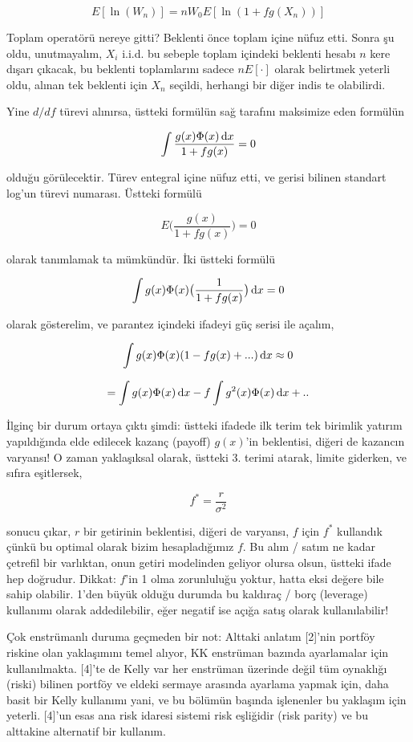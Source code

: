 \documentclass[12pt,fleqn]{article}\usepackage{../../common}
\begin{document}
$$ E[\ln(W_n)] = n W_0 E[\ln (1+fg(X_n))]  $$

Toplam operatörü nereye gitti? Beklenti önce toplam içine nüfuz etti. Sonra
şu oldu, unutmayalım, $X_i$ i.i.d. bu sebeple toplam içindeki beklenti
hesabı $n$ kere dışarı çıkacak, bu beklenti toplamlarını sadece $n
E[\cdot]$ olarak belirtmek yeterli oldu, alınan tek beklenti için $X_n$
seçildi, herhangi bir diğer indis te olabilirdi.

Yine $d/df$ türevi alınırsa, üstteki formülün sağ tarafını maksimize eden
formülün 

$$ \int \frac{g(x) \Phi(x) \,\mathrm{d} x}{1 + fg(x)} = 0$$

olduğu görülecektir. Türev entegral içine nüfuz etti, ve gerisi bilinen
standart log'un türevi numarası. Üstteki formülü 

$$ E \bigg( \frac{g(x)}{1+fg(x)} \bigg) = 0$$

olarak tanımlamak ta mümkündür. İki üstteki formülü 

$$ \int g(x) \Phi(x) \big(\frac{1}{1 + fg(x)} \big) \,\mathrm{d} x = 0$$

olarak gösterelim, ve parantez içindeki ifadeyi güç serisi ile açalım, 

$$ \int g(x) \Phi(x) (1 - fg(x) + ...)  \,\mathrm{d} x \approx 0$$

$$ = \int g(x)\Phi(x) \,\mathrm{d} x  - f \int g^2(x)\Phi(x) \,\mathrm{d} x + ..  $$

İlginç bir durum ortaya çıktı şimdi: üstteki ifadede ilk terim tek birimlik
yatırım yapıldığında elde edilecek kazanç (payoff) $g(x)$'in beklentisi,
diğeri de kazancın varyansı! O zaman yaklaşıksal olarak, üstteki 3. terimi
atarak, limite giderken, ve sıfıra eşitlersek,

$$ f^\ast = \frac{r}{\sigma^2} $$

sonucu çıkar, $r$ bir getirinin beklentisi, diğeri de varyansı, $f$ için
$f^\ast$ kullandık çünkü bu optimal olarak bizim hesapladığımız $f$. Bu alım /
satım ne kadar çetrefil bir varlıktan, onun getiri modelinden geliyor
olursa olsun, üstteki ifade hep doğrudur. Dikkat: $f$'in 1 olma zorunluluğu
yoktur, hatta eksi değere bile sahip olabilir. 1'den büyük olduğu durumda
bu kaldıraç / borç (leverage) kullanımı olarak addedilebilir, eğer negatif
ise açığa satış olarak kullanılabilir! 

Çok enstrümanlı duruma geçmeden bir not: Alttaki anlatım [2]'nin portföy riskine
olan yaklaşımını temel alıyor, KK enstrüman bazında ayarlamalar için
kullanılmakta. [4]'te de Kelly var her enstrüman üzerinde değil tüm oynaklığı
(riski) bilinen portföy ve eldeki sermaye arasında ayarlama yapmak için, daha
basit bir Kelly kullanımı yani, ve bu bölümün başında işlenenler bu yaklaşım
için yeterli. [4]'un esas ana risk idaresi sistemi risk eşliğidir (risk parity)
ve bu alttakine alternatif bir kullanım. 
\end{document}

